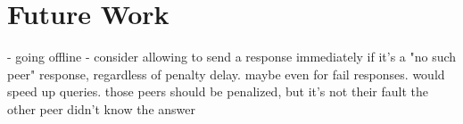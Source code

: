 \chapter{Future Work}
\label{chap:future_work}
- going offline
- consider allowing to send a response immediately if it's a "no such peer"
  response, regardless of penalty delay. maybe even for fail responses. would
  speed up queries. those peers should be penalized, but it's not their fault
  the other peer didn't know the answer
